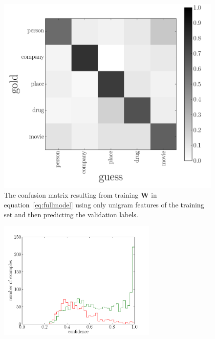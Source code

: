 \documentclass[11pt]{article}
\newcommand{\figlabel}[1]{\label{fig:#1}}
\newcommand{\bvec}[1]{\ensuremath{\boldsymbol{#1}}}
\begin{document}
\begin{figure}[htbp]
\begin{center}
    \includegraphics[width=\textwidth]{unigram_confusion.pdf}
\end{center}
\caption{%
The confusion matrix resulting from training $\bvec{W}$ in
equation~\ref{eq:fullmodel} using only unigram features of the training set
and then predicting the validation labels.
\figlabel{unigram-confusion}}
\end{figure}

\begin{figure}[htbp]
\begin{center}
    \includegraphics[width=0.7\textwidth]{unigram_confidence_hist.pdf}
\end{center}
\caption{%
\figlabel{unigram-confidence-hist}}
\end{figure}
\end{document}
